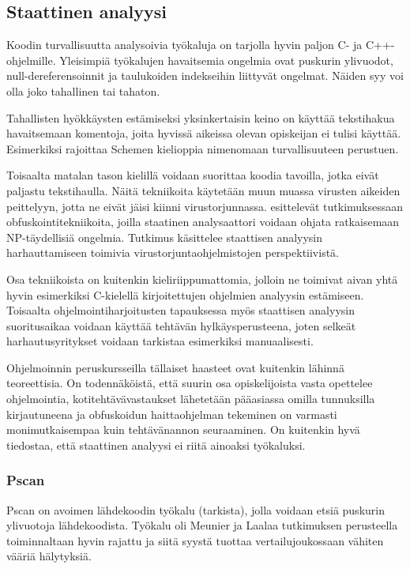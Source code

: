 \subsection{Staattinen analyysi}

Koodin turvallisuutta analysoivia työkaluja on tarjolla hyvin paljon C- ja
C++-ohjelmille. Yleisimpiä työkalujen havaitsemia ongelmia ovat puskurin
ylivuodot, null-dereferensoinnit ja taulukoiden indekseihin liittyvät
ongelmat. Näiden syy voi olla joko tahallinen tai tahaton.

Tahallisten hyökkäysten estämiseksi yksinkertaisin keino on käyttää
tekstihakua havaitsemaan komentoja, joita hyvissä aikeissa olevan opiskeijan
ei tulisi käyttää. Esimerkiksi {\scmrobo} rajoittaa Schemen kielioppia
nimenomaan turvallisuuteen perustuen.

Toisaalta matalan tason kielillä voidaan suorittaa koodia tavoilla, jotka
eivät paljastu tekstihaulla. Näitä tekniikoita käytetään muun muassa virusten
aikeiden peittelyyn, jotta ne eivät jäisi kiinni virustorjunnassa.
\citet{moser2007limits} esittelevät tutkimuksessaan obfuskointitekniikoita,
joilla staatinen analysaattori voidaan ohjata ratkaisemaan NP-täydellisiä
ongelmia. Tutkimus käsittelee staattisen analyysin harhauttamiseen toimivia
virustorjuntaohjelmistojen perspektiivistä.

Osa tekniikoista on kuitenkin kieliriippumattomia, jolloin ne toimivat aivan
yhtä hyvin esimerkiksi C-kielellä kirjoitettujen ohjelmien analyysin
estämiseen. Toisaalta ohjelmointiharjoitusten tapauksessa myös staattisen
analyysin suoritusaikaa voidaan käyttää tehtävän hylkäysperusteena, joten
selkeät harhautusyritykset voidaan tarkistaa esimerkiksi manuaalisesti.

Ohjelmoinnin peruskursseilla tällaiset haasteet ovat kuitenkin lähinnä
teoreettisia. On todennäköistä, että suurin osa opiskelijoista vasta opettelee
ohjelmointia, kotitehtävävastaukset lähetetään pääasiassa omilla tunnuksilla
kirjautuneena ja obfuskoidun haittaohjelman tekeminen on varmasti
monimutkaisempaa kuin tehtävänannon seuraaminen. On kuitenkin hyvä tiedostaa,
että staattinen analyysi ei riitä ainoaksi työkaluksi.

\citet{tevis2004methods}

\subsubsection{Pscan}

Pscan on avoimen lähdekoodin työkalu (tarkista), jolla voidaan etsiä puskurin
ylivuotoja lähdekoodista. Työkalu oli Meunier ja Laalaa tutkimuksen perusteella
toiminnaltaan hyvin rajattu ja siitä syystä tuottaa vertailujoukossaan vähiten
vääriä hälytyksiä.


